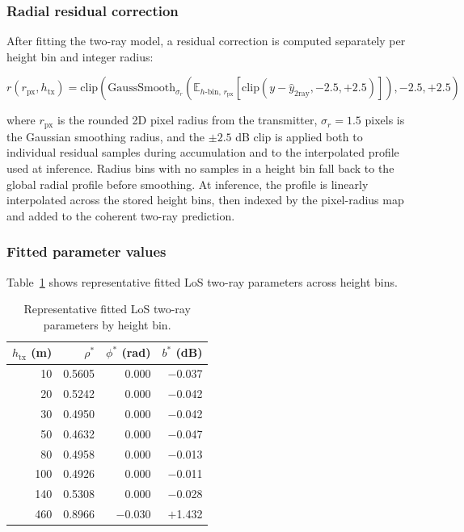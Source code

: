 \subsubsection{Radial residual correction}

After fitting the two-ray model, a residual correction is computed separately
per height bin and integer radius:

\begin{equation}
r(r_{\mathrm{px}},h_{\mathrm{tx}})
=
\mathrm{clip}\!\left(
\mathrm{GaussSmooth}_{\sigma_r}\left(
\mathbb{E}_{h\text{-bin},\,r_{\mathrm{px}}}
\left[
\mathrm{clip}\!\left(y-\hat y_{\mathrm{2ray}},-2.5,+2.5\right)
\right]
\right)
\!, -2.5,+2.5
\right)
\end{equation}

where $r_{\mathrm{px}}$ is the rounded 2D pixel radius from the transmitter,
$\sigma_r = 1.5$ pixels is the Gaussian smoothing radius, and the $\pm2.5$ dB
clip is applied both to individual residual samples during accumulation and
to the interpolated profile used at inference. Radius bins with no samples in
a height bin fall back to the global radial profile before smoothing. At
inference, the profile is linearly interpolated across the stored height bins,
then indexed by the pixel-radius map and added to the coherent two-ray
prediction.

\subsubsection{Fitted parameter values}

Table~\ref{tab:los_params} shows representative fitted LoS two-ray parameters
across height bins.

\begin{table}[H]
\centering
\caption{Representative fitted LoS two-ray parameters by height bin.}
\label{tab:los_params}
\small
\begin{tabular}{rrrr}
\toprule
$h_{\mathrm{tx}}$ (m) & $\rho^*$ & $\phi^*$ (rad) & $b^*$ (dB)\\
\midrule
10  & 0.5605 & 0.000 & $-$0.037 \\
20  & 0.5242 & 0.000 & $-$0.042 \\
30  & 0.4950 & 0.000 & $-$0.042 \\
50  & 0.4632 & 0.000 & $-$0.047 \\
80  & 0.4958 & 0.000 & $-$0.013 \\
100 & 0.4926 & 0.000 & $-$0.011 \\
140 & 0.5308 & 0.000 & $-$0.028 \\
460 & 0.8966 & $-$0.030 & $+$1.432 \\
\bottomrule
\end{tabular}
\end{table}


